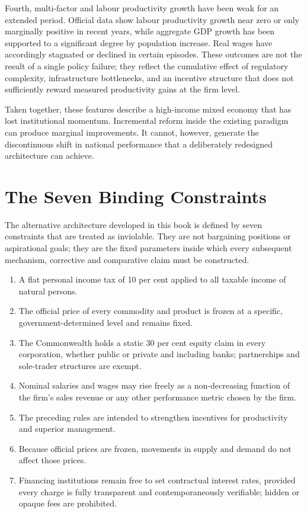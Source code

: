 \documentclass[12pt,anyside]{book}
\theoremstyle{definition}
\theoremstyle{plain}
\theoremstyle{remark}
\begin{document}
Fourth, multi-factor and labour productivity growth have been weak for an extended period. Official data show labour productivity growth near zero or only marginally positive in recent years, while aggregate GDP growth has been supported to a significant degree by population increase. Real wages have accordingly stagnated or declined in certain episodes. These outcomes are not the result of a single policy failure; they reflect the cumulative effect of regulatory complexity, infrastructure bottlenecks, and an incentive structure that does not sufficiently reward measured productivity gains at the firm level.

Taken together, these features describe a high-income mixed economy that has lost institutional momentum. Incremental reform inside the existing paradigm can produce marginal improvements. It cannot, however, generate the discontinuous shift in national performance that a deliberately redesigned architecture can achieve.

\section{The Seven Binding Constraints}

The alternative architecture developed in this book is defined by seven constraints that are treated as inviolable. They are not bargaining positions or aspirational goals; they are the fixed parameters inside which every subsequent mechanism, corrective and comparative claim must be constructed.

\begin{enumerate}[label=\arabic*)]
\item A flat personal income tax of 10 per cent applied to all taxable income of natural persons.
\item The official price of every commodity and product is frozen at a specific, government-determined level and remains fixed.
\item The Commonwealth holds a static 30 per cent equity claim in every corporation, whether public or private and including banks; partnerships and sole-trader structures are exempt.
\item Nominal salaries and wages may rise freely as a non-decreasing function of the firm’s sales revenue or any other performance metric chosen by the firm.
\item The preceding rules are intended to strengthen incentives for productivity and superior management.
\item Because official prices are frozen, movements in supply and demand do not affect those prices.
\item Financing institutions remain free to set contractual interest rates, provided every charge is fully transparent and contemporaneously verifiable; hidden or opaque fees are prohibited.
\end{enumerate}
\end{document}
